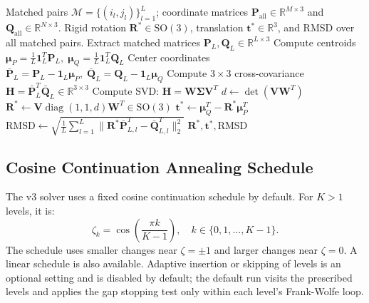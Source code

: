 \documentclass[conference]{IEEEtran}
\begin{document}
\begin{algorithm}[t]
\caption{Phase 2 Closed-Form 3D Kabsch Superposition}
\label{alg:kabsch}
\begin{algorithmic}[1]
\REQUIRE Matched pairs $\mathcal{M} = \{(i_l, j_l)\}_{l=1}^L$; coordinate matrices $\mathbf{P}_{\text{all}} \in \mathbb{R}^{M \times 3}$ and $\mathbf{Q}_{\text{all}} \in \mathbb{R}^{N \times 3}$.
\ENSURE Rigid rotation $\mathbf{R}^* \in \mathrm{SO}(3)$, translation $\mathbf{t}^* \in \mathbb{R}^3$, and RMSD over all matched pairs.
\STATE Extract matched matrices $\mathbf{P}_L, \mathbf{Q}_L \in \mathbb{R}^{L \times 3}$
\STATE Compute centroids $\boldsymbol{\mu}_P = \frac{1}{L}\mathbf{1}_L^T\mathbf{P}_L, \; \boldsymbol{\mu}_Q = \frac{1}{L}\mathbf{1}_L^T\mathbf{Q}_L$
\STATE Center coordinates $\bar{\mathbf{P}}_L = \mathbf{P}_L - \mathbf{1}_L\boldsymbol{\mu}_P, \; \bar{\mathbf{Q}}_L = \mathbf{Q}_L - \mathbf{1}_L\boldsymbol{\mu}_Q$
\STATE Compute $3 \times 3$ cross-covariance $\mathbf{H} = \bar{\mathbf{P}}_L^T \bar{\mathbf{Q}}_L \in \mathbb{R}^{3 \times 3}$ 
\STATE Compute SVD: $\mathbf{H} = \mathbf{W}\mathbf{\Sigma}\mathbf{V}^T$ 
\STATE $d \leftarrow \det(\mathbf{V}\mathbf{W}^T)$ 
\STATE $\mathbf{R}^* \leftarrow \mathbf{V} \operatorname{diag}(1, 1, d) \mathbf{W}^T \in \mathrm{SO}(3)$ 
\STATE $\mathbf{t}^* \leftarrow \boldsymbol{\mu}_Q^T - \mathbf{R}^*\boldsymbol{\mu}_P^T$ 
\STATE $\text{RMSD} \leftarrow \sqrt{\frac{1}{L}\sum_{l=1}^L \|\mathbf{R}^* \bar{\mathbf{P}}_{L, l}^T - \bar{\mathbf{Q}}_{L, l}^T\|_2^2}$
\RETURN $\mathbf{R}^*, \mathbf{t}^*, \text{RMSD}$
\end{algorithmic}
\end{algorithm}

\subsection{Cosine Continuation Annealing Schedule}

The v3 solver uses a fixed cosine continuation schedule by default. For $K>1$ levels, it is:
\begin{equation}
\zeta_k = \cos\!\left(\frac{\pi k}{K - 1}\right), \quad k \in \{0, 1, \ldots, K - 1\}.
\label{eq:cosine_schedule}
\end{equation}
The schedule uses smaller changes near $\zeta=\pm1$ and larger changes near $\zeta=0$. A linear schedule is also available. Adaptive insertion or skipping of levels is an optional setting and is disabled by default; the default run visits the prescribed levels and applies the gap stopping test only within each level's Frank-Wolfe loop.
\end{document}
